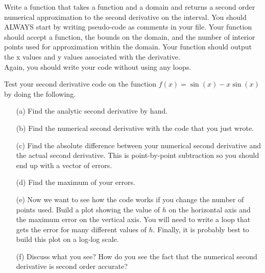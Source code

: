 \begin{problem}
    Write a \ProgLang function that takes a function and a domain and returns a second order
    numerical approximation to the second derivative on the interval. You should ALWAYS start by writing pseudo-code as comments in your
    \ProgLang file.    Your function should
    accept a function, the bounds on the domain, and the number of
    interior points used for approximation within the domain. Your function should output
    the x values and y values associated with the derivative.\\
    \ifnum{}
    \else
    \fi
    Again, you should write your code without using any  loops.
\end{problem}

\begin{problem}
    Test your second derivative code on the function $f(x) = \sin(x) - x\sin(x)$ by doing
    the following.  
    \begin{enumerate}
        \item[(a)] Find the analytic second derivative by hand.
        \item[(b)] Find the numerical second derivative with the code that you just wrote.
        \item[(c)] Find the absolute difference between your numerical second derivative
            and the actual second derivative.  This is point-by-point subtraction so you
            should end up with a vector of errors. 
        \item[(d)] Find the maximum of your errors.
        \item[(e)] Now we want to see how the code works if you change the number of
            points used.  Build a plot showing the value of $h$ on the horizontal axis
            and the maximum error on the vertical axis.  You will need to write a loop
            that gets the error for many different values of $h$.  Finally, it is probably
            best to build this plot on a log-log scale.
        \item[(f)] Discuss what you see?  How do you see the fact that the numerical
            second derivative is second order accurate?
    \end{enumerate}
\end{problem}

